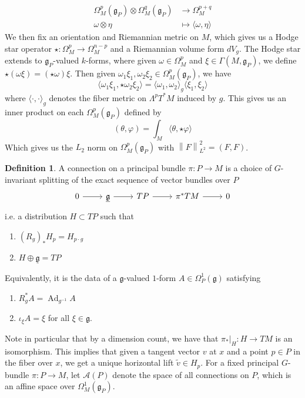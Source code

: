 \documentclass[psamsfonts, 12pt]{amsart}
\theoremstyle{definition}
\newtheorem{defn}[thm]{Definition}
\theoremstyle{remark}
\newcommand{\g}{\mathfrak{g}}
\newcommand{\inv}{^{-1}}
\newcommand{\norm}[1]{\left\lVert#1\right\rVert}
\DeclareMathOperator{\Ad}{Ad}
\begin{document}
\begin{align*}
\Omega^p_M(\g_P) \otimes \Omega^q_M(\g_P) &\to \Omega^{p+q}_M \\
\omega \otimes \eta &\mapsto \langle \omega, \eta \rangle
\end{align*}
%
We then fix an orientation and Riemannian metric on $M$, which gives us a Hodge
star operator $\star : \Omega^p_M \to \Omega^{n-p}_M$ and a Riemannian volume form
$dV_g$. The Hodge star extends to $\g_P$-valued $k$-forms, where given
$\omega \in \Omega^p_M$ and $\xi \in \Gamma(M,\g_P)$, we define
$\star(\omega\xi) = (\star\omega)\xi$. Then given
$\omega_1\xi_1,\omega_2\xi_2 \in \Omega^p_M(\g_P)$, we have
\[
\langle\omega_1\xi_1,\star\omega_2\xi_2\rangle =
\langle \omega_1,\omega_2\rangle_g\langle\xi_1,\xi_2\rangle
\]
where $\langle\cdot,\cdot\rangle_g$ denotes the fiber metric on $\Lambda^pT^*M$
induced by $g$. This gives us an inner product on each $\Omega^p_M(\g_P)$ defined
by
\[
(\theta,\varphi) = \int_M \langle \theta,\star\varphi\rangle
\]
Which gives us the $L_2$ norm on $\Omega^p_M(\g_P)$ with $\norm{F}_{L^2}^2 = (F,F)$.
\begin{defn}
A connection on a principal bundle $\pi : P \to M$ is a choice of $G$-invariant splitting
of the exact sequence of vector bundles over $P$
\[\begin{tikzcd}
0 \ar[r] & \underline{\g} \ar[r] & TP \ar[r] & \pi^*TM \ar[r] & 0
\end{tikzcd}\]
i.e. a distribution $H \subset TP$ such that
\begin{enumerate}
  \item $(R_g)_*H_p = H_{p\cdot g}$
  \item $H \oplus \underline{\g} = TP$
\end{enumerate}
Equivalently, it is the data of a $\g$-valued $1$-form $A \in \Omega^1_P(\g)$
satisfying
\begin{enumerate}
  \item $R_g^*A = \Ad_{g\inv} A$
  \item $\iota_\xi A = \xi$ for all $\xi \in \g$.
\end{enumerate}
\end{defn}
%
Note in particular that by a dimension count, we have that $\pi_*\vert_H : H \to TM$ is
an isomorphism. This implies that given a tangent vector $v$ at $x$ and a point
$p \in P$ in the fiber over $x$, we get a unique horizontal lift
$\tilde{v} \in H_p$. For a fixed principal $G$-bundle $\pi : P \to M$, let
$\mathscr{A}(P)$ denote the space of all connections on $P$, which is an affine space
over $\Omega^1_M(\g_P)$. \\
\end{document}
